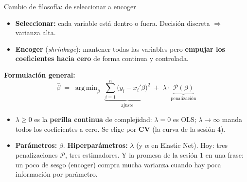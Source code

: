 \documentclass{beamer}
\newcommand{\1}{\mathbb{I}}
\DeclareMathOperator*{\argmin}{arg\,min}
\begin{document}
\begin{frame}{Cambio de filosofía: de seleccionar a encoger}
\small
\begin{itemize}\itemsep4pt
  \item \textbf{Seleccionar:} cada variable está dentro o fuera. Decisión discreta $\Rightarrow$ varianza alta.
  \item \textbf{Encoger} (\emph{shrinkage}): mantener todas las variables pero \textbf{empujar los coeficientes hacia cero} de forma continua y controlada.
\end{itemize}
\pause
\vspace{0.1cm}
\textbf{Formulación general:}
\[ \hat{\beta} \;=\; \argmin_{\beta} \; \underbrace{\sum_{i=1}^n \big(y_i - x_i'\beta\big)^2}_{\text{ajuste}} \;+\; \lambda \cdot \underbrace{\mathcal{P}(\beta)}_{\text{penalización}} \]
\pause
\begin{itemize}\itemsep4pt
  \item $\lambda \geq 0$ es la \textbf{perilla continua} de complejidad: $\lambda = 0$ es OLS; $\lambda \to \infty$ manda todos los coeficientes a cero. Se elige por \textbf{CV} (la curva de la sesión 4).
  \item \textbf{Parámetros:} $\beta$. \textbf{Hiperparámetros:} $\lambda$ (y $\alpha$ en Elastic Net). Hoy: tres penalizaciones $\mathcal{P}$, tres estimadores. Y la promesa de la sesión 1 en una frase: un poco de sesgo (encoger) compra mucha varianza cuando hay poca información por parámetro.
\end{itemize}
\end{frame}
\end{document}
